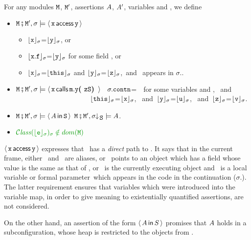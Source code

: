 \begin{definition}  \label{def:valid:assertion:space}
For any modules $\M$, $\M'$, assertions $\A$, $\A'$, variables  and , we define
\begin{itemize}
\item
$\M\mkpair \M', \sigma \models  \CanAccess{\prg{x}}{\prg{y}}$   \IFF  \begin{itemize}
\item
$\interp {\x} {\sigma}$=$\interp {\y} {\sigma}$, or
\item
$\interp {\x.\f} {\sigma}$=$\interp {\y} {\sigma}$  for some field ,  or
\item
$\interp {\x} {\sigma}$=$\interp {\this} {\sigma}$ and
  $\interp {\y} {\sigma}$=$\interp {\z} {\sigma}$,\ 
and \z\ appears in  $\sigma$..
 \end{itemize}
   \item
$\M\mkpair \M', \sigma \models  \Calls {\prg{x}} {\prg{y}}  {\prg{m}} {\prg{zS}}$ \IFF \
 $\sigma.\prg{contn}$=\ \ for some variables  and ,  \ and \
\\ $\strut ~ \hspace{1.4in} $
$\interp{\prg{this}}{\sigma}$=$\interp{\prg{x}}{\sigma}$, \ and\ $\interp{\prg{y}}{\sigma}$=$\interp{\prg{u}}{\sigma}$,
 \ and\ $\interp{\prg{z}}{\sigma}$=$\interp{\prg{v}}{\sigma}$.
 \item
 $\M\mkpair \M', \sigma \models \Using {\A} {\prg{S}}$
 \IFF
 $\M\mkpair \M', \restrct \sigma {\prg{S}} \models  \A  $.
 \item
  \IFF
$\sd{ {\ClassOf {\interp{\SE}{\sigma}}{\sigma}}\notin dom(\M)}$
\end{itemize}
\end{definition}
\noindent 
$\CanAccess{\prg{x}}{\prg{y}}$ expresses that \x\, has a {\em direct} path to \y.
It says that in the current frame,
either \x~and \y\ are  aliases, or \x~points to an object which has a field
whose value is the same as that of \y, or \x\, is the currently executing object and \y\, is
 a local variable or formal parameter \z\,which appears in the code in the continuation ($\sigma$.).
The latter requirement ensures that variables which were introduced into the variable map,
in order to give meaning to existentially quantified assertions, are not considered.

On the other hand, an assertion of the form $\Using{A}{S}$ promises that $\A$ holds in a subconfiguration, whose heap is restricted to the objects from .


